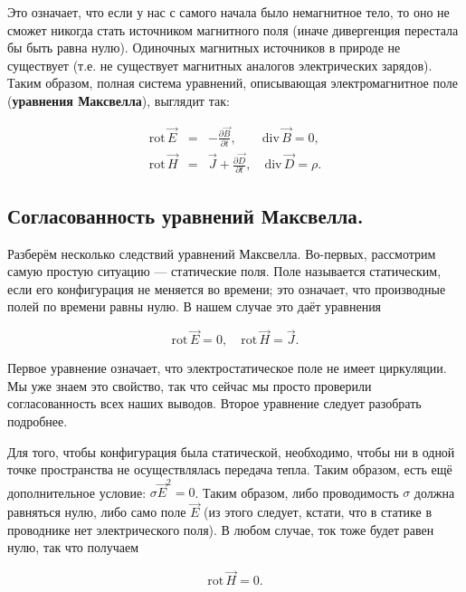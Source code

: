 \documentclass[12pt,a4paper]{article}
\numberwithin{equation}{section}
\numberwithin{equation}{section}
\newcommand{\nn}{\nonumber}
\newcommand{\pt}{\partial}
\newcommand{\rot}{\mathrm{rot}\,}
\renewcommand{\div}{\mathrm{div}\,}
\begin{document}
Это означает, что если у нас с самого начала было немагнитное тело, то
оно не сможет никогда стать источником магнитного поля (иначе
дивергенция перестала бы быть равна нулю). Одиночных магнитных
источников в природе не существует (т.е. не существует магнитных
аналогов электрических зарядов). Таким образом, полная система
уравнений, описывающая электромагнитное поле (\textbf{уравнения
  Максвелла}), выглядит так:

\begin{eqnarray}
  \label{eq:maxwell_equations}
  \nn
  \rot \vec{E} &=& - \frac{\pt \vec{B}}{\pt t}, \qquad \div \vec{B} = 0,\\
  \rot \vec{H} &=& \vec{J} + \frac{\pt \vec{D}}{\pt t}, \quad \div
  \vec{D} = \rho.
\end{eqnarray}

\subsection{Согласованность уравнений Максвелла.}
\label{sec:cons_maxwell}

Разберём несколько следствий уравнений Максвелла. Во-первых,
рассмотрим самую простую ситуацию --- статические поля. Поле
называется статическим, если его конфигурация не меняется во времени;
это означает, что производные полей по времени равны нулю. В нашем
случае это даёт уравнения

\begin{equation}
  \label{eq:statics_maxwell_1}
  \rot \vec{E} = 0, \quad \rot \vec{H} = \vec{J}.
\end{equation}

Первое уравнение означает, что электростатическое поле не имеет
циркуляции. Мы уже знаем это свойство, так что сейчас мы просто
проверили согласованность всех наших выводов. Второе уравнение следует
разобрать подробнее. 

Для того, чтобы конфигурация была статической, необходимо, чтобы ни в
одной точке пространства не осуществлялась передача тепла. Таким
образом, есть ещё дополнительное условие: $\sigma \vec{E}^2 =
0$. Таким образом, либо проводимость $\sigma$ должна равняться нулю,
либо само поле $\vec{E}$ (из этого следует, кстати, что в статике в
проводнике нет электрического поля). В любом случае, ток тоже будет
равен нулю, так что получаем

\begin{equation}
  \label{eq:statics_maxwell_2}
  \rot \vec{H} = 0.
\end{equation}
\end{document}
